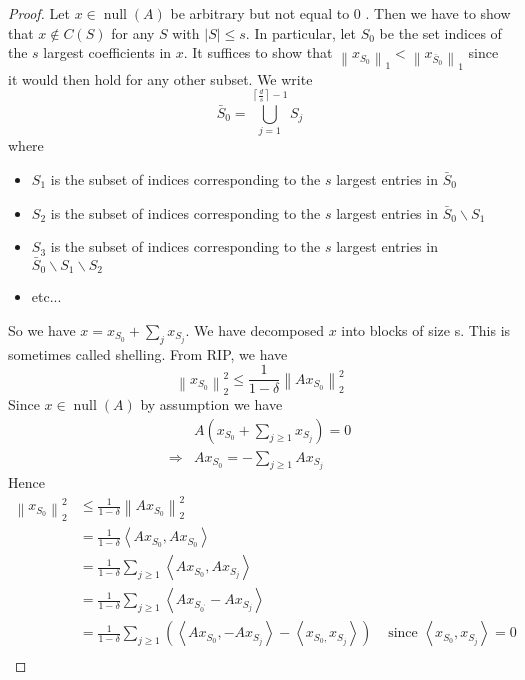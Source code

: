 \documentclass[11pt]{article}
\begin{document}
\begin{proof}
Let $x \in \operatorname{null}(A)$ be arbitrary but not equal to 0 . Then we have to show that $x \notin C(S)$ for any $S$ with $|S| \leqslant s$. In particular, let $S_{0}$ be the set indices of the $s$ largest coefficients in $x$. It suffices to show that $\left\|x_{S_{0}}\right\|_{1}<\left\|x_{\bar{S}_{0}}\right\|_{1}$ since it would then hold for any other subset.
We write
$$
\bar{S}_{0}=\bigcup_{j=1}^{\left\lceil\frac{d}{s}\right\rceil-1} S_{j}
$$
where
\begin{itemize}
    \item $S_{1}$ is the subset of indices corresponding to the $s$ largest entries in $\bar{S}_{0}$
    \item $S_{2}$ is the subset of indices corresponding to the $s$ largest entries in $\bar{S}_{0} \backslash S_{1}$
    \item $S_{3}$ is the subset of indices corresponding to the $s$ largest entries in $\bar{S}_{0} \backslash S_{1} \backslash S_{2}$
    \item etc...
\end{itemize}
So we have $x=x_{S_{0}}+\sum_{j} x_{S_{j}}$. We have decomposed $x$ into blocks of size s. This is sometimes called shelling. From RIP, we have
$$
\left\|x_{S_{0}}\right\|_{2}^{2} \leqslant \frac{1}{1-\delta}\left\|A x_{S_{0}}\right\|_{2}^{2}
$$
Since $x \in \operatorname{null}(A)$ by assumption we have
$$
\begin{aligned}
& A\left(x_{S_{0}}+\sum_{j \geqslant 1} x_{S_{j}}\right)=0 \\
\Longrightarrow & A x_{S_{0}}=-\sum_{j \geqslant 1} A x_{S_{j}}
\end{aligned}
$$   
Hence
$$
\begin{aligned}
\left\|x_{S_{0}}\right\|_{2}^{2} & \leqslant \frac{1}{1-\delta}\left\|A x_{S_{0}}\right\|_{2}^{2} & \\
& =\frac{1}{1-\delta}\left\langle A x_{S_{0}}, A x_{S_{0}}\right\rangle & \\
& =\frac{1}{1-\delta} \sum_{j \geqslant 1}\left\langle A x_{S_{0}}, A x_{S_{j}}\right\rangle & \\
& =\frac{1}{1-\delta} \sum_{j \geqslant 1}\left\langle A x_{S_{0^{\prime}}}-A x_{S_{j}}\right\rangle & \\
& =\frac{1}{1-\delta} \sum_{j \geqslant 1}\left(\left\langle A x_{S_{0}},-A x_{S_{j}}\right\rangle-\left\langle x_{S_{0},} x_{S_{j}}\right\rangle\right) & \text { since }\left\langle x_{S_{0}}, x_{S_{j}}\right\rangle=0 \\

\end{aligned}$$
\end{proof}
\end{document}
